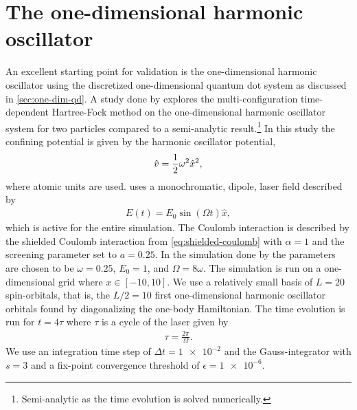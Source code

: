    \section{The one-dimensional harmonic oscillator}
        An excellent starting point for validation is the one-dimensional
        harmonic oscillator using the discretized one-dimensional quantum dot
        system as discussed in \autoref{sec:one-dim-qd}.
        A study done by \citeauthor{zanghellini_2004} \cite{zanghellini_2004}
        explores the multi-configuration time-dependent Hartree-Fock method on
        the one-dimensional harmonic oscillator system for two particles
        compared to a semi-analytic result.\footnote{%
            Semi-analytic as the time evolution is solved numerically.
        }
        In this study the confining potential is given by the harmonic
        oscillator potential,
        \begin{align}
            \hat{v} = \frac{1}{2} \omega^2\hat{x}^2,
        \end{align}
        where atomic units are used.
        \citeauthor{zanghellini_2004} uses a monochromatic, dipole, laser field
        described by
        \begin{align}
            E(t) = E_0\sin(\Omega t)\hat{x},
        \end{align}
        which is active for the entire simulation.
        The Coulomb interaction is described by the shielded Coulomb interaction
        from \autoref{eq:shielded-coulomb} with $\alpha = 1$ and the screening
        parameter set to $a = 0.25$.
        In the simulation done by \citeauthor{zanghellini_2004} the parameters
        are chosen to be $\omega = 0.25$, $E_0 = 1$, and $\Omega = 8\omega$.
        The simulation is run on a one-dimensional grid where $x \in [-10, 10]$.
        We use a relatively small basis of $L = 20$ spin-orbitals, that is, the
        $L / 2 = 10$ first one-dimensional harmonic oscillator orbitals found by
        diagonalizing the one-body Hamiltonian.
        The time evolution is run for $t = 4\tau$ where $\tau$ is a cycle of the
        laser given by
        \begin{align}
            \tau = \frac{2\pi}{\Omega}.
        \end{align}
        We use an integration time step of $\Delta t = \num{1e-2}$ and the
        Gauss-integrator with $s = 3$ and a fix-point convergence threshold of
        $\epsilon = \num{1e-6}$.

